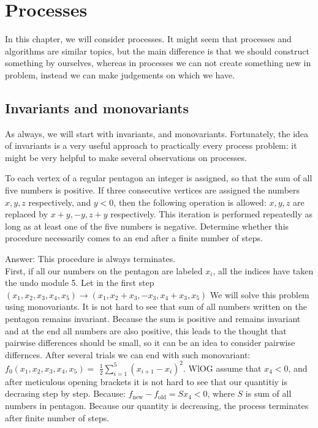 \chapter{Processes}
In this chapter, we will consider processes. It might seem that processes and algorithms are similar topics, but the main difference is that we should construct something by ourselves, whereas in processes we can not create something new in problem, instead we can make judgements on which we have.

\section{Invariants and monovariants}
As always, we will start with invariants, and monovariants. Fortunately, the idea of invariants is a very useful approach to practically every process problem: it might be very helpful to make several observations on processes.
\begin{example}[IMO 1986]
    To each vertex of a regular pentagon an integer is assigned, so that the sum of all five numbers is positive. If three consecutive vertices are assigned the numbers $x,y,z$ respectively, and $y<0$, then the following operation is allowed: $x,y,z$ are replaced by $x+y,-y,z+y$ respectively. This iteration is performed repeatedly as long as at least one of the five numbers is negative. Determine whether this procedure necessarily comes to an end after a finite number of steps.
\end{example}
\sol
Answer: This procedure is always terminates.
\\
First, if all our numbers on the pentagon are labeled $x_i$, all the indices have taken the undo module 5. Let in the first step $(x_1,x_2,x_3,x_4,x_5) \to (x_1,x_2+x_3,-x_3,x_4+x_3,x_5)$
We will solve this problem using monovariants. It is not hard to see that sum of all numbers written on the pentagon remains invariant. Because the sum is positive and remains invariant and at the end all numbers are also positive, this leads to the thought that pairwise differences should be small, so it can be an idea to consider pairwise differnces.  After several trials we can end with such monovariant:
$f_0(x_1,x_2,x_3,x_4,x_5)=$
$ \frac{1}{2} \sum_{i=1}^5 (x_{i+1}-x_i)^2$.
WlOG assume that $x_4<0$, and after meticulous opening brackets it is not hard to see that our quantitiy is decrasing step by step. Because: $f_{\text{new}}-f_{\text{old}}=Sx_4<0$, where $S$ is sum of all numbers in pentagon. Because our quantity is decreasing, the process terminates after finite number of steps.


